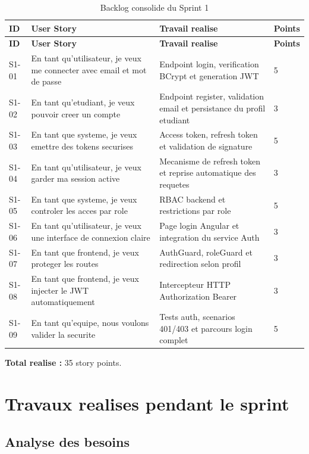 \documentclass[12pt,a4paper]{report}
\begin{document}
\begin{longtable}{|p{1.6cm}|p{5.3cm}|p{5.4cm}|p{1.4cm}|}
\caption{Backlog consolide du Sprint 1}\\
\hline
\textbf{ID} & \textbf{User Story} & \textbf{Travail realise} & \textbf{Points} \\
\hline
\endfirsthead
\hline
\textbf{ID} & \textbf{User Story} & \textbf{Travail realise} & \textbf{Points} \\
\hline
\endhead
S1-01 & En tant qu'utilisateur, je veux me connecter avec email et mot de passe & Endpoint login, verification BCrypt et generation JWT & 5 \\
\hline
S1-02 & En tant qu'etudiant, je veux pouvoir creer un compte & Endpoint register, validation email et persistance du profil etudiant & 3 \\
\hline
S1-03 & En tant que systeme, je veux emettre des tokens securises & Access token, refresh token et validation de signature & 5 \\
\hline
S1-04 & En tant qu'utilisateur, je veux garder ma session active & Mecanisme de refresh token et reprise automatique des requetes & 3 \\
\hline
S1-05 & En tant que systeme, je veux controler les acces par role & RBAC backend et restrictions par role & 5 \\
\hline
S1-06 & En tant qu'utilisateur, je veux une interface de connexion claire & Page login Angular et integration du service Auth & 3 \\
\hline
S1-07 & En tant que frontend, je veux proteger les routes & AuthGuard, roleGuard et redirection selon profil & 3 \\
\hline
S1-08 & En tant que frontend, je veux injecter le JWT automatiquement & Intercepteur HTTP Authorization Bearer & 3 \\
\hline
S1-09 & En tant qu'equipe, nous voulons valider la securite & Tests auth, scenarios 401/403 et parcours login complet & 5 \\
\hline
\end{longtable}

\textbf{Total realise :} 35 story points.

\section{Travaux realises pendant le sprint}

\subsection{Analyse des besoins}
\end{document}
